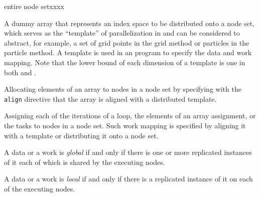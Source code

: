 \begin{namelist}{entire node setxxxx}

 A dummy array that represents an index space to be distributed onto a
 node set, which serves as the ``template'' of parallelization in
 {\XMP} and can be considered to abstract, for example, a set of grid
 points in the grid method or particles in the particle method.
%
 A template is used in an {\XMP} program to specify the data and work
 mapping.
%
 Note that the lower bound of each dimension of a template is one in
 both {\XMPF} and {\XMPC}.



 Allocating elements of an array to nodes in a node set by specifying
 with the {\tt align} directive that the array is aligned with a
 distributed template.



 Assigning each of the iterations of a loop, the elements of an array
 assignment, or the tasks to nodes in a node set. Such work mapping is
 specified by aligning it with a template or distributing it onto a
 node set.

%


 A data or a work is {\it global} if and only if there is one or more
 replicated instances of it each of which is shared by the executing
 nodes.


 A data or a work is {\it local} if and only if there is a replicated
 instance of it on each of the executing nodes.



\end{namelist}

